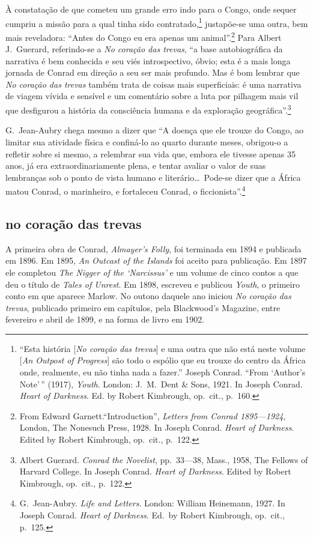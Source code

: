 À constatação de que cometeu um grande erro indo para o Congo,
onde sequer cumpriu a missão para a qual tinha sido
contratado,\footnote{ ``Esta história [\textit{No coração das trevas}] e uma outra que não
está neste volume [\textit{An Outpost of Progress}] são todo o espólio
que eu trouxe do centro da África onde, realmente, eu não tinha nada a
fazer.'' Joseph Conrad. ``From `Author's Note'\,'' (1917), \textit{Youth}.
London: J.~M.~Dent \& Sons, 1921. In Joseph Conrad. \textit{Heart of
Darkness}. Ed. by Robert Kimbrough, op.~cit., p.~160.} 
justapõe{}-se uma outra, bem mais reveladora: ``Antes do Congo
eu era apenas um animal''.\footnote{ From Edward Garnett.``Introduction'', 
\textit{Letters from Conrad 1895---1924}, London, The Nonesuch Press, 1928. In Joseph Conrad.
\textit{Heart of Darkness}. Edited by Robert Kimbrough, op.~cit., p.~122.}
Para Albert J.~Guerard, referindo{}-se a \textit{No coração das trevas}, 
``a base autobiográfica da narrativa é bem conhecida e seu viés introspectivo, óbvio; esta é a mais longa jornada
de Conrad em direção a seu ser mais profundo. Mas é bom lembrar que
\textit{No coração das trevas} também trata de coisas mais superficiais: 
é uma narrativa de viagem vívida e sensível
e um comentário sobre a luta por pilhagem mais vil que desfigurou a
história da consciência humana e da exploração
geográfica''.\footnote{ Albert Guerard. \textit{Conrad the Novelist}, pp.~33---38, Mass., 1958,
The Fellows of Harvard College. In Joseph Conrad. \textit{Heart of
Darkness}. Edited by Robert Kimbrough, op.~cit., p.~122.}

G.~Jean{}-Aubry chega mesmo a dizer que ``A doença que ele
trouxe do Congo, ao limitar sua atividade física e confiná{}-lo ao
quarto durante meses, obrigou{}-o a refletir sobre si mesmo, a
relembrar sua vida que, embora ele tivesse apenas 35 anos, já era
extraordinariamente plena, e tentar avaliar o valor de suas lembranças
sob o ponto de vista humano e literário\ldots\ Pode{}-se dizer que a
África matou Conrad, o marinheiro, e fortaleceu Conrad, o
ficcionista''.\footnote{ G.~Jean{}-Aubry. \textit{Life and Letters}. London: William Heinemann,
1927. In Joseph Conrad. \textit{Heart of Darkness}. Ed.~by Robert Kimbrough, op.~cit., p.~125.}

\subsection{no coração das trevas}

A primeira obra de Conrad, \textit{Almayer's Folly}, foi terminada em
1894 e publicada em 1896. Em 1895, \textit{An Outcast of the Islands}
foi aceito para publicação.  Em 1897 ele completou \textit{The Nigger
of the `Narcissus'} e um volume de cinco contos a que deu o título de
\textit{Tales of Unrest}. Em  1898, escreveu e publicou \textit{Youth},
o primeiro conto em que aparece Marlow. No outono daquele ano iniciou
\textit{No coração das trevas}, publicado primeiro em capítulos, pela
Blackwood's Magazine, entre fevereiro e abril de 1899, e na forma de livro em 1902.

